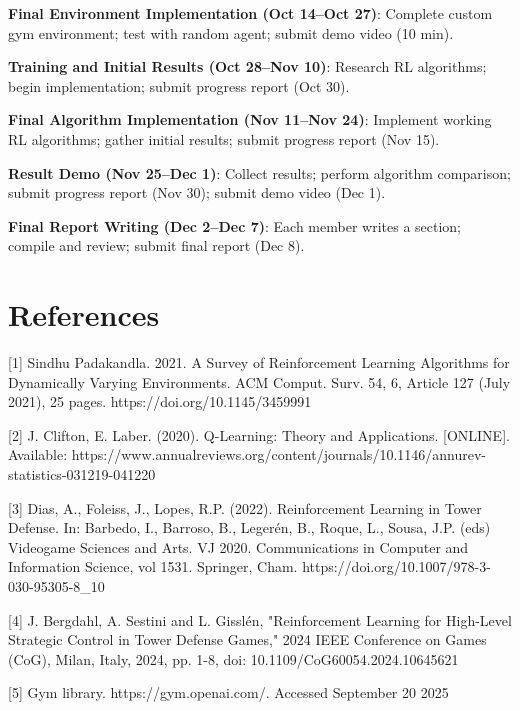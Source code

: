 \documentclass[12pt]{article}
\begin{document}
\textbf{Final Environment Implementation (Oct 14--Oct 27)}: Complete custom gym environment; test with random agent; submit demo video (10 min). 

\textbf{Training and Initial Results (Oct 28--Nov 10)}: Research RL algorithms; begin implementation; submit progress report (Oct 30). 

\textbf{Final Algorithm Implementation (Nov 11--Nov 24)}: Implement working RL algorithms; gather initial results; submit progress report (Nov 15). 

\textbf{Result Demo (Nov 25--Dec 1)}: Collect results; perform algorithm comparison; submit progress report (Nov 30); submit demo video (Dec 1). 

\textbf{Final Report Writing (Dec 2--Dec 7)}: Each member writes a section; compile and review; submit final report (Dec 8).




\vspace{0.5em}
\newpage 

\section*{References}

[1] Sindhu Padakandla. 2021. A Survey of Reinforcement Learning Algorithms for Dynamically Varying Environments. ACM Comput. Surv. 54, 6, Article 127 (July 2021), 25 pages.
https://doi.org/10.1145/3459991 \par

[2] J. Clifton, E. Laber. (2020). Q-Learning: Theory and Applications. [ONLINE]. Available: https://www.annualreviews.org/content/journals/10.1146/annurev-statistics-031219-041220 \par

[3] Dias, A., Foleiss, J., Lopes, R.P. (2022). Reinforcement Learning in Tower Defense. In: Barbedo, I., Barroso, B., Legerén, B., Roque, L., Sousa, J.P. (eds) Videogame Sciences and Arts. VJ 2020. Communications in Computer and Information Science, vol 1531. Springer, Cham. https://doi.org/10.1007/978-3-030-95305-8\_10 \par 

[4] J. Bergdahl, A. Sestini and L. Gisslén, "Reinforcement Learning for High-Level Strategic Control in Tower Defense Games," 2024 IEEE Conference on Games (CoG), Milan, Italy, 2024, pp. 1-8, doi: 10.1109/CoG60054.2024.10645621 \par

[5] Gym library. https://gym.openai.com/. Accessed September 20 2025
\end{document}

